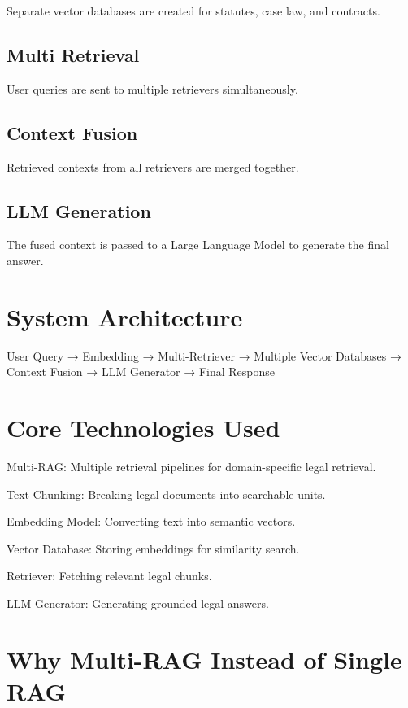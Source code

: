 \documentclass[12pt,a4paper]{article}
\begin{document}
Separate vector databases are created for statutes, case law, and contracts.

\subsection{Multi Retrieval}

User queries are sent to multiple retrievers simultaneously.

\subsection{Context Fusion}

Retrieved contexts from all retrievers are merged together.

\subsection{LLM Generation}

The fused context is passed to a Large Language Model to generate the final answer.

\section{System Architecture}

User Query → Embedding → Multi-Retriever → Multiple Vector Databases → Context Fusion → LLM Generator → Final Response

\section{Core Technologies Used}

Multi-RAG: Multiple retrieval pipelines for domain-specific legal retrieval.

Text Chunking: Breaking legal documents into searchable units.

Embedding Model: Converting text into semantic vectors.

Vector Database: Storing embeddings for similarity search.

Retriever: Fetching relevant legal chunks.

LLM Generator: Generating grounded legal answers.

\section{Why Multi-RAG Instead of Single RAG}
\end{document}
